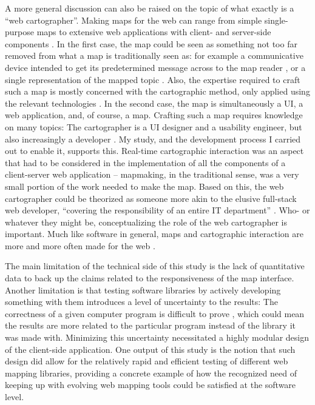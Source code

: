 A more general discussion can also be raised on the topic of what exactly is
a \enquote{web cartographer}.
Making maps for the web can range from simple
single-purpose maps to extensive web applications with
client- and server-side components \parencite{vee2017, mai2017}.
In the first case,
the map could be seen as something not too far removed from
what a map is traditionally seen as: for example a communicative
device intended to get its predetermined message across to the map reader
\parencite{kol1969},
or a single representation of the mapped topic \parencite{tyn1992}.
Also, the expertise required to craft such a map is mostly concerned with
the cartographic method, only applied using the relevant technologies \parencite{rot2021}.
In the second case,
the map is simultaneously a UI, a web application, and, of course, a map.
Crafting such a map requires knowledge on many topics:
The cartographer is a UI designer and a usability engineer,
but also increasingly a developer \parencite{rot2017, mai2017}.
My study, and the development process I carried out to enable it, supports this.
Real-time cartographic interaction was an aspect that had to be considered
in the implementation of all the components of a client-server web application --
mapmaking, in the traditional sense, was a very small portion of the work
needed to make the map.
Based on this,
the web cartographer could be theorized as
someone more akin to the elusive full-stack web developer,
\enquote{covering the responsibility of an entire IT
department} \parencite[p.~370]{tai2021}.
Who- or whatever they might be, conceptualizing the role of the web cartographer is important.
Much like software in general, maps and cartographic interaction
are more and more often made for the web \parencite{tai2017, rot2021, vee2017}.

The main limitation of the technical side of this study
is the lack of quantitative data to back up
the claims related to the responsiveness of the map interface.
Another limitation is that testing software libraries by
actively developing something with them introduces
a level of uncertainty to the results:
The correctness of a given computer program is difficult to prove
\parencite{dij1970, amm2016},
which could mean the results are more related to the particular program
instead of the library it was made with.
Minimizing this uncertainty necessitated
a highly modular design of the client-side application.
One output of this study is the notion that such design did allow for
the relatively rapid and efficient testing of different web mapping libraries,
providing a concrete example of
how the recognized need of keeping up with evolving web mapping tools \parencite{rot2014, rot2021}
could be satisfied at the software level.


